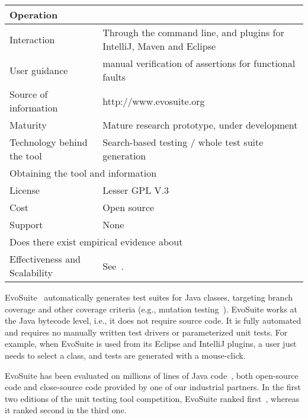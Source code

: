 \documentclass[10pt,conference,compsocconf]{IEEEtran}
\newcommand{\EVOSUITE}{{\sc EvoSuite}\xspace}
\begin{document}
\begin{table}[!h]
\begin{tabular}{|l|p{5cm}|}
  \hline
  \multicolumn{2}{|l|}{Operation} \\
  \hline
  Interaction &  Through the command line, and plugins for IntelliJ, Maven and Eclipse\\
  User guidance &  manual verification of assertions for functional faults\\
  Source of information &  http://www.evosuite.org \\
  Maturity&  Mature research prototype, under development\\
  Technology behind the tool & Search-based testing / whole test suite generation\\
\hline
  \multicolumn{2}{|l|}{Obtaining the tool and information} \\
  \hline
License & Lesser GPL V.3\\
Cost & Open source\\
Support & None \\
\hline
\hline
  \multicolumn{2}{|l|}{Does there exist empirical evidence about} \\
  \hline
  Effectiveness and Scalability & See~\cite{GoA_TSE12,fraser2014large}. \\
\hline
\end{tabular}\vspace{-1em}
\end{table}


\EVOSUITE~\cite{FrA11c,GoA_TSE12} automatically generates test suites
for Java classes, targeting branch coverage and other coverage
criteria (e.g., mutation testing~\cite{emse14_mutation}). \EVOSUITE
works at the Java bytecode level, i.e., it does not require source
code. It is fully automated and requires no manually written test
drivers or parameterized unit tests.  For example, when \EVOSUITE is
used from its Eclipse and IntelliJ plugins, a user
just needs to select a class, and tests are generated with a mouse-click.

\EVOSUITE has been evaluated on millions of lines of Java
code~\cite{fraser2014large}, both open-source code and close-source
code provided by one of our industrial partners.  In the first two
editions of the unit testing tool competition, \EVOSUITE ranked
first~\cite{evosuiteAtSbst2013,evosuiteAtFittest2013}, whereas it
ranked second in the third one.
\end{document}
